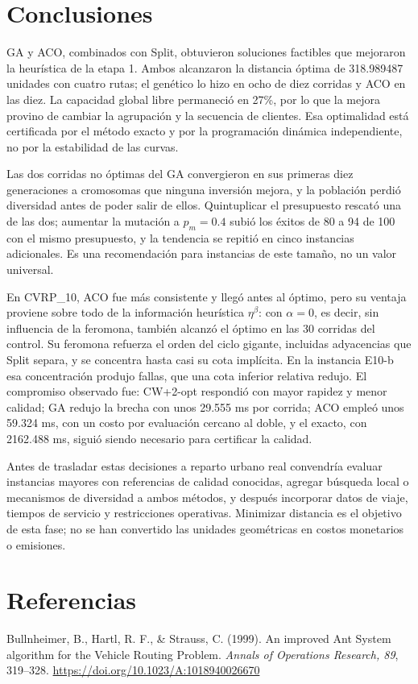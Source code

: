 \documentclass[11pt,a4paper]{article}
\numberwithin{equation}{section}
\begin{document}
\section{Conclusiones}

GA y ACO, combinados con Split, obtuvieron soluciones factibles que mejoraron la heurística de la etapa 1. Ambos alcanzaron la distancia óptima de 318.989487 unidades con cuatro rutas; el genético lo hizo en ocho de diez corridas y ACO en las diez. La capacidad global libre permaneció en 27\%, por lo que la mejora provino de cambiar la agrupación y la secuencia de clientes. Esa optimalidad está certificada por el método exacto y por la programación dinámica independiente, no por la estabilidad de las curvas.

Las dos corridas no óptimas del GA convergieron en sus primeras diez generaciones a cromosomas que ninguna inversión mejora, y la población perdió diversidad antes de poder salir de ellos. Quintuplicar el presupuesto rescató una de las dos; aumentar la mutación a \(p_m=0.4\) subió los éxitos de 80 a 94 de 100 con el mismo presupuesto, y la tendencia se repitió en cinco instancias adicionales. Es una recomendación para instancias de este tamaño, no un valor universal.

En CVRP\_10, ACO fue más consistente y llegó antes al óptimo, pero su ventaja proviene sobre todo de la información heurística \(\eta^\beta\): con \(\alpha=0\), es decir, sin influencia de la feromona, también alcanzó el óptimo en las 30 corridas del control. Su feromona refuerza el orden del ciclo gigante, incluidas adyacencias que Split separa, y se concentra hasta casi su cota implícita. En la instancia E10-b esa concentración produjo fallas, que una cota inferior relativa redujo. El compromiso observado fue: CW+2-opt respondió con mayor rapidez y menor calidad; GA redujo la brecha con unos 29.555 ms por corrida; ACO empleó unos 59.324 ms, con un costo por evaluación cercano al doble, y el exacto, con 2162.488 ms, siguió siendo necesario para certificar la calidad.

Antes de trasladar estas decisiones a reparto urbano real convendría evaluar instancias mayores con referencias de calidad conocidas, agregar búsqueda local o mecanismos de diversidad a ambos métodos, y después incorporar datos de viaje, tiempos de servicio y restricciones operativas. Minimizar distancia es el objetivo de esta fase; no se han convertido las unidades geométricas en costos monetarios o emisiones.

\section*{Referencias}
\setlength{\parskip}{3pt}
Bullnheimer, B., Hartl, R. F., \& Strauss, C. (1999). An improved Ant System algorithm for the Vehicle Routing Problem. \emph{Annals of Operations Research, 89}, 319--328. \url{https://doi.org/10.1023/A:1018940026670}
\end{document}
